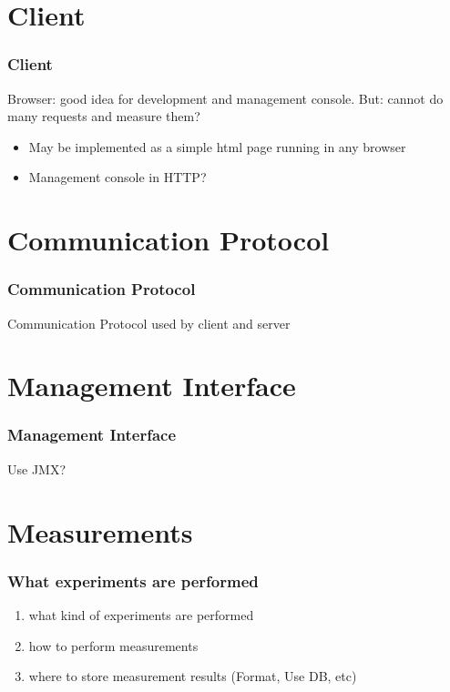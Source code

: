 \documentclass{beamer}
\begin{document}
\section{Client}
\begin{frame}
\frametitle{Client}
Browser: good idea for development and management console.
But: cannot do many requests and measure them?
\begin{itemize}
\item May be implemented as a simple html page running in any browser
\item Management console in HTTP?
\end{itemize}
\end{frame}


\section{Communication Protocol}
\begin{frame}
\frametitle{Communication Protocol}
Communication Protocol used by client and server
\end{frame}



\section{Management Interface}
\begin{frame}
\frametitle{Management Interface}
Use JMX?
\end{frame}


\section{Measurements}
\begin{frame}
\frametitle{What experiments are performed}


\begin{enumerate}
\item what kind of experiments are performed
\item how to perform measurements
\item where to store measurement results (Format, Use DB, etc)
\end{enumerate}

\end{frame}
\end{document}
